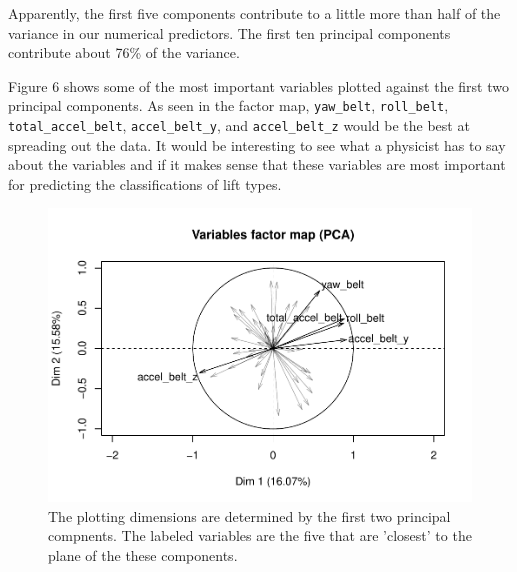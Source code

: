 \documentclass[12pt,twoside]{reedthesis}
\begin{document}
  Apparently, the first five components contribute to a little more than
  half of the variance in our numerical predictors. The first ten
  principal components contribute about 76\% of the variance.
  
  Figure 6 shows some of the most important variables plotted against the
  first two principal components. As seen in the factor map,
  \texttt{yaw\_belt}, \texttt{roll\_belt}, \texttt{total\_accel\_belt},
  \texttt{accel\_belt\_y}, and \texttt{accel\_belt\_z} would be the best
  at spreading out the data. It would be interesting to see what a
  physicist has to say about the variables and if it makes sense that
  these variables are most important for predicting the classifications of
  lift types.
  
  \newpage
  
  \begin{Shaded}
  \begin{Highlighting}[]
   \NormalTok{, } \NormalTok{)}
  \end{Highlighting}
  \end{Shaded}
  
  \begin{figure}
  
  {\centering \includegraphics{A_Random_Forest_Model_for_Computer-Assisted_Activity-Recognition_files/figure-latex/unnamed-chunk-51-1} 
  
  }
  
  \caption[The plotting dimensions are determined by the first two principal compnents]{The plotting dimensions are determined by the first two principal compnents.  The labeled variables are the five that are 'closest' to the plane of the these components.}\label{fig:unnamed-chunk-51}
  \end{figure}
  
\end{document}

